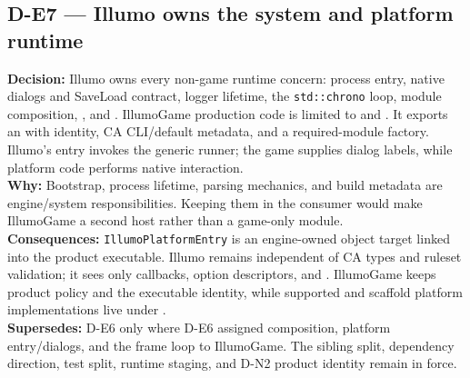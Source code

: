 \subsection*{D-E7 --- Illumo owns the system and platform runtime}
\begin{decisionbox}[title={D-E7 \quad 2026-08-18}]
\textbf{Decision:} Illumo owns every non-game runtime concern: process entry,
native dialogs and SaveLoad contract, logger lifetime, the
\texttt{std::chrono} loop, module composition, , and
. IllumoGame production code is limited to
 and . It exports an
 with identity, CA CLI/default metadata,
and a required-module factory. Illumo's entry invokes the generic runner; the
game supplies dialog labels, while platform code performs native interaction.\\
\textbf{Why:} Bootstrap, process lifetime, parsing mechanics, and build metadata
are engine/system responsibilities. Keeping them in the consumer would make
IllumoGame a second host rather than a game-only module.\\
\textbf{Consequences:} \texttt{IllumoPlatformEntry} is an engine-owned object
target linked into the product executable. Illumo remains independent of CA
types and ruleset validation; it sees only callbacks, option descriptors, and
. IllumoGame keeps product policy and the executable identity,
while supported and scaffold platform implementations live under
.\\
\textbf{Supersedes:} D-E6 only where D-E6 assigned composition, platform
entry/dialogs, and the frame loop to IllumoGame. The sibling split, dependency
direction, test split, runtime staging, and D-N2 product identity remain in
force.
\end{decisionbox}

